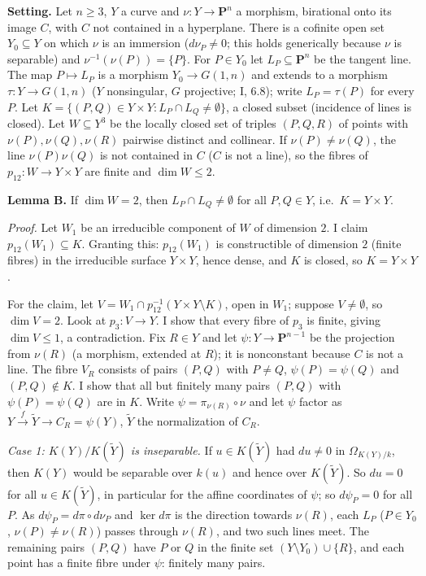 \documentclass[11pt]{article}
\begin{document}
\textbf{Setting.} Let $n\ge3$, $Y$ a curve and $\nu:Y\to\mathbf P^n$ a morphism, birational onto its image $C$, with $C$ not contained in a hyperplane. There is a cofinite open set $Y_0\subseteq Y$ on which $\nu$ is an immersion ($d\nu_P\ne0$; this holds generically because $\nu$ is separable) and $\nu^{-1}(\nu(P))=\{P\}$. For $P\in Y_0$ let $L_P\subseteq\mathbf P^n$ be the tangent line. The map $P\mapsto L_P$ is a morphism $Y_0\to G(1,n)$ and extends to a morphism $\tau:Y\to G(1,n)$ ($Y$ nonsingular, $G$ projective; I, 6.8); write $L_P=\tau(P)$ for every $P$. Let $K=\{(P,Q)\in Y\times Y:L_P\cap L_Q\ne\emptyset\}$, a closed subset (incidence of lines is closed). Let $W\subseteq Y^3$ be the locally closed set of triples $(P,Q,R)$ of points with $\nu(P),\nu(Q),\nu(R)$ pairwise distinct and collinear. If $\nu(P)\ne\nu(Q)$, the line $\nu(P)\nu(Q)$ is not contained in $C$ ($C$ is not a line), so the fibres of $p_{12}:W\to Y\times Y$ are finite and $\dim W\le2$.

\textbf{Lemma B.} If $\dim W=2$, then $L_P\cap L_Q\ne\emptyset$ for all $P,Q\in Y$, i.e.\ $K=Y\times Y$.

\emph{Proof.} Let $W_1$ be an irreducible component of $W$ of dimension $2$. I claim $p_{12}(W_1)\subseteq K$. Granting this: $p_{12}(W_1)$ is constructible of dimension $2$ (finite fibres) in the irreducible surface $Y\times Y$, hence dense, and $K$ is closed, so $K=Y\times Y$.

For the claim, let $V=W_1\cap p_{12}^{-1}(Y\times Y\setminus K)$, open in $W_1$; suppose $V\neq\emptyset$, so $\dim V=2$. Look at $p_3:V\to Y$. I show that every fibre of $p_3$ is finite, giving $\dim V\le1$, a contradiction. Fix $R\in Y$ and let $\psi:Y\to\mathbf P^{n-1}$ be the projection from $\nu(R)$ (a morphism, extended at $R$); it is nonconstant because $C$ is not a line. The fibre $V_R$ consists of pairs $(P,Q)$ with $P\ne Q$, $\psi(P)=\psi(Q)$ and $(P,Q)\notin K$. I show that all but finitely many pairs $(P,Q)$ with $\psi(P)=\psi(Q)$ are in $K$. Write $\psi=\pi_{\nu(R)}\circ\nu$ and let $\psi$ factor as $Y\xrightarrow{f}\tilde Y\to C_R=\psi(Y)$, $\tilde Y$ the normalization of $C_R$.

\emph{Case 1: $K(Y)/K(\tilde Y)$ is inseparable.} If $u\in K(\tilde Y)$ had $du\ne0$ in $\Omega_{K(Y)/k}$, then $K(Y)$ would be separable over $k(u)$ and hence over $K(\tilde Y)$. So $du=0$ for all $u\in K(\tilde Y)$, in particular for the affine coordinates of $\psi$; so $d\psi_P=0$ for all $P$. As $d\psi_P=d\pi\circ d\nu_P$ and $\ker d\pi$ is the direction towards $\nu(R)$, each $L_P$ ($P\in Y_0$, $\nu(P)\ne\nu(R)$) passes through $\nu(R)$, and two such lines meet. The remaining pairs $(P,Q)$ have $P$ or $Q$ in the finite set $(Y\setminus Y_0)\cup\{R\}$, and each point has a finite fibre under $\psi$: finitely many pairs.
\end{document}
